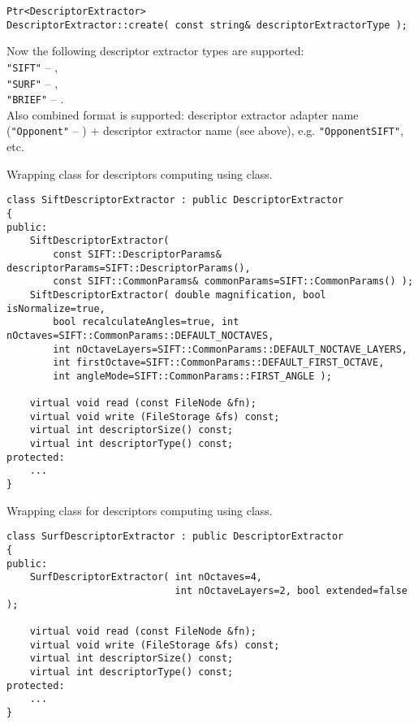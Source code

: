 \begin{lstlisting}
Ptr<DescriptorExtractor> 
DescriptorExtractor::create( const string& descriptorExtractorType );
\end{lstlisting}

\begin{description}
\end{description}

Now the following descriptor extractor types are supported:\\
\texttt{"SIFT"} -- ,\\
\texttt{"SURF"} -- ,\\
\texttt{"BRIEF"} -- .\\
Also combined format is supported: descriptor extractor adapter name (\texttt{"Opponent"} -- 
) + descriptor extractor name (see above), 
e.g. \texttt{"OpponentSIFT"}, etc.

Wrapping class for descriptors computing using  class.

\begin{lstlisting}
class SiftDescriptorExtractor : public DescriptorExtractor
{
public:
    SiftDescriptorExtractor( 
        const SIFT::DescriptorParams& descriptorParams=SIFT::DescriptorParams(),
        const SIFT::CommonParams& commonParams=SIFT::CommonParams() );
    SiftDescriptorExtractor( double magnification, bool isNormalize=true, 
        bool recalculateAngles=true, int nOctaves=SIFT::CommonParams::DEFAULT_NOCTAVES,
        int nOctaveLayers=SIFT::CommonParams::DEFAULT_NOCTAVE_LAYERS,
        int firstOctave=SIFT::CommonParams::DEFAULT_FIRST_OCTAVE,
        int angleMode=SIFT::CommonParams::FIRST_ANGLE );

    virtual void read (const FileNode &fn);
    virtual void write (FileStorage &fs) const;
    virtual int descriptorSize() const;
    virtual int descriptorType() const;
protected:
    ...
}
\end{lstlisting}

Wrapping class for descriptors computing using  class.

\begin{lstlisting}
class SurfDescriptorExtractor : public DescriptorExtractor
{
public:
    SurfDescriptorExtractor( int nOctaves=4,
                             int nOctaveLayers=2, bool extended=false );

    virtual void read (const FileNode &fn);
    virtual void write (FileStorage &fs) const;
    virtual int descriptorSize() const;
    virtual int descriptorType() const;
protected:
    ...
}
\end{lstlisting}

